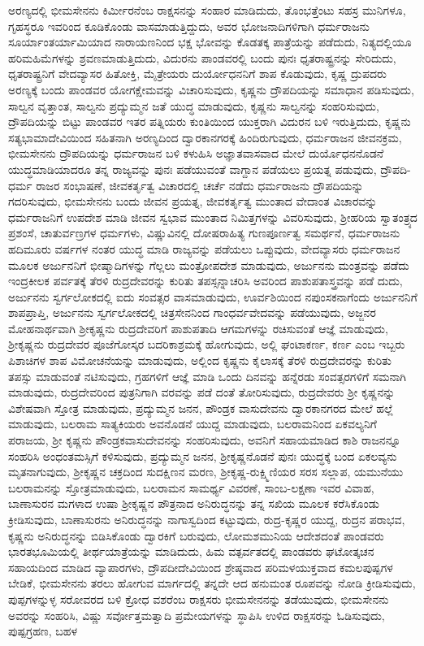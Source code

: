 ಅರಣ್ಯದಲ್ಲಿ ಭೀಮಸೇನನು ಕಿರ್ಮೀರನೆಂಬ ರಾಕ್ಷಸನನ್ನು ಸಂಹಾರ ಮಾಡಿದುದು, ತೊಂಭತ್ತೆಂಟು ಸಹಸ್ರ ಮುನಿಗಳೂ, ಗೃಹಸ್ಥರೂ ಇವರಿಂದ ಕೂಡಿಕೊಂಡು ವಾಸಮಾಡು\-ತ್ತಿದ್ದುದು, ಅವರ ಭೋಜನಾದಿಗಳಿಗಾಗಿ ಧರ್ಮರಾಜನು ಸೂರ್ಯಾಂತರ್ಯಾಮಿಯಾದ ನಾರಾಯಣನಿಂದ ಭಕ್ಷ ಭೋವನ್ನು ಕೊಡತಕ್ಕ ಪಾತ್ರೆಯನ್ನು ಪಡೆದುದು, ನಿತ್ಯದಲ್ಲಿಯೂ ಹರಿಮಹಿಮೆಗಳನ್ನು ಶ್ರವಣಮಾಡುತ್ತಿದುದು, ವಿದುರನು ಪಾಂಡವರಲ್ಲಿ ಬಂದು ಪುನಃ ಧೃತರಾಷ್ಟ್ರನನ್ನು ಸೇರಿದುದು, ಧೃತರಾಷ್ಟ್ರನಿಗೆ ವೇದವ್ಯಾಸರ ಹಿತೋಕ್ತಿ, ಮೈತ್ರೇಯರು ದುರ್ಯೋಧನನಿಗೆ ಶಾಪ ಕೊಡುವುದು, ಕೃಷ್ಣ ದ್ರುಪದರು ಅರಣ್ಯಕ್ಕೆ ಬಂದು ಪಾಂಡವರ ಯೋಗಕ್ಷೇಮವನ್ನು ವಿಚಾರಿಸುವುದು, ಕೃಷ್ಣನು ದ್ರೌಪದಿಯನ್ನು ಸಮಾಧಾನ ಪಡಿಸುವುದು, ಸಾಲ್ವನ ವೃತ್ತಾಂತ, ಸಾಲ್ವನು ಪ್ರದ್ಯುಮ್ಮನ ಜತೆ ಯುದ್ಧ ಮಾಡುವುದು, ಕೃಷ್ಣನು ಸಾಲ್ವನನ್ನು ಸಂಹರಿಸುವುದು, ದ್ರೌಪದಿಯನ್ನು ಬಿಟ್ಟು ಪಾಂಡವರ ಇತರ ಪತ್ನಿಯರು ಕುಂತಿಯಿಂದ ಯುಕ್ತರಾಗಿ ವಿದುರನ ಬಳಿ ಇರುತ್ತಿದುದು, ಕೃಷ್ಣನು ಸತ್ಯಭಾಮಾದೇವಿಯಿಂದ ಸಹಿತನಾಗಿ ಅರಣ್ಯದಿಂದ ದ್ವಾರಕಾನಗರಕ್ಕೆ ಹಿಂದಿರುಗುವುದು, ಧರ್ಮರಾಜನ ಜೀವನಕ್ರಮ, ಭೀಮಸೇನನು ದ್ರೌಪದಿಯನ್ನು ಧರ್ಮರಾಜನ ಬಳಿ ಕಳುಹಿಸಿ ಅಜ್ಞಾತವಾಸವಾದ ಮೇಲೆ ದುರ್ಯೊಧನನೊಡನೆ ಯುದ್ಧಮಾಡಿಯಾದರೂ ತನ್ನ ರಾಜ್ಯವನ್ನು ಪುನಃ ಪಡೆಯುವಂತೆ ವಾಗ್ದಾನ ಪಡೆಯಲು ಪ್ರಯತ್ನ ಪಡುವುದು, ದ್ರೌಪದಿ-ಧರ್ಮ ರಾಜರ ಸಂಭಾಷಣೆ, ಜೀವಕರ್ತೃತ್ವ ವಿಚಾರದಲ್ಲಿ ಚರ್ಚೆ ನಡೆದು ಧರ್ಮರಾಜನು ದ್ರೌಪದಿಯನ್ನು ಗದರಿಸುವುದು, ಭೀಮಸೇನನು ಬಂದು ಜೀವನ ಪ್ರಯತ್ನ, ಜೀವಕರ್ತೃತ್ವ ಮುಂತಾದ ವೇದಾಂತ ವಿಚಾರವನ್ನು ಧರ್ಮರಾಜನಿಗೆ ಉಪದೇಶ ಮಾಡಿ ಜೀವನ ಸ್ವಭಾವ ಮುಂತಾದ ನಿಮಿತ್ತಗಳನ್ನು ವಿವರಿಸುವುದು, ಶ‍್ರೀಹರಿಯ ಸ್ವಾತಂತ್ರ್ಯದ ಪ್ರಶಂಸೆ, ಚಾತುರ್ವಣ್ರಗಳ ಧರ್ಮಗಳು, ವಿಷ್ಣುವಿನಲ್ಲಿ ದೋಷರಾಹಿತ್ಯ ಗುಣಪೂರ್ಣತ್ವ ಸಮರ್ಥನೆ, ಧರ್ಮರಾಜನು ಹದಿಮೂರು ವರ್ಷಗಳ ನಂತರ ಯುದ್ಧ ಮಾಡಿ ರಾಜ್ಯವನ್ನು ಪಡೆಯಲು ಒಪ್ಪುವುದು, ವೇದವ್ಯಾಸರು ಧರ್ಮರಾಜನ ಮೂಲಕ ಅರ್ಜುನನಿಗೆ ಭೀಷ್ಮಾದಿಗಳನ್ನು ಗೆಲ್ಲಲು ಮಂತ್ರೋಪದೇಶ ಮಾಡುವುದು, ಅರ್ಜುನನು ಮಂತ್ರವನ್ನು ಪಡೆದು ಇಂದ್ರಕೀಲಕ ಪರ್ವತಕ್ಕೆ ತೆರಳಿ ರುದ್ರದೇವರನ್ನು ಕುರಿತು ತಪಸ್ಸನ್ನಾಚರಿಸಿ ಅವರಿಂದ ಪಾಶುಪತಾಸ್ತ್ರವನ್ನು ಪಡೆ ದುದು, ಅರ್ಜುನನು ಸ್ವರ್ಗಲೋಕದಲ್ಲಿ ಐದು ಸಂವತ್ಸರ ವಾಸಮಾಡುವುದು, ಊರ್ವಶಿಯಿಂದ ನಪುಂಸಕನಾಗೆಂದು ಅರ್ಜುನನಿಗೆ ಶಾಪಪ್ರಾಪ್ತಿ, ಅರ್ಜುನನು ಸ್ವರ್ಗಲೋಕದಲ್ಲಿ ಚಿತ್ರಸೇನನಿಂದ ಗಾಂಧರ್ವವೇದವನ್ನು ಪಡೆಯುವುದು, ಅಜ್ಜನರ ಮೋಹನಾರ್ಥವಾಗಿ ಶ‍್ರೀಕೃಷ್ಣನು ರುದ್ರದೇವರಿಗೆ ಪಾಶುಪತಾದಿ ಆಗಮಗಳನ್ನು ರಚಿಸುವಂತೆ ಆಜ್ಞೆ ಮಾಡುವುದು, ಶ‍್ರೀಕೃಷ್ಣನು ರುದ್ರದೇವರ ಪೂಜೆಗೋಸ್ಕರ ಬದರಿಕಾಶ್ರಮಕ್ಕೆ ಹೋಗುವುದು, ಅಲ್ಲಿ ಘಂಟಾಕರ್ಣ, ಕರ್ಣ ಎಂಬ ಇಬ್ಬರು ಪಿಶಾಚಿಗಳ ಶಾಪ ವಿಮೋಚನೆಯನ್ನು ಮಾಡುವುದು, ಅಲ್ಲಿಂದ ಕೃಷ್ಣನು ಕೈಲಾಸಕ್ಕೆ ತೆರಳಿ ರುದ್ರದೇವರನ್ನು ಕುರಿತು ತಪಸ್ಸು ಮಾಡುವಂತೆ ನಟಿಸುವುದು, ಗ್ರಹಗಳಿಗೆ ಆಜ್ಞೆ ಮಾಡಿ ಒಂದು ದಿನವನ್ನು ಹನ್ನೆರಡು ಸಂವತ್ಸರಗಳಿಗೆ ಸಮನಾಗಿ ಮಾಡುವುದು, ರುದ್ರದೇವರಿಂದ ಪುತ್ರನಿಗಾಗಿ ವರವನ್ನು ಪಡೆ ದಂತೆ ತೋರಿಸುವುದು, ರುದ್ರದೇವರು ಶ‍್ರೀ ಕೃಷ್ಣನನ್ನು ವಿಶೇಷವಾಗಿ ಸ್ತೋತ್ರ ಮಾಡುವುದು, ಪ್ರದ್ಯುಮ್ಮನ ಜನನ, ಪೌಂಡ್ರಕ ವಾಸುದೇವನು ದ್ವಾರಕಾನಗರದ ಮೇಲೆ ಹಲ್ಲೆ ಮಾಡುವುದು, ಬಲರಾಮ ಸಾತ್ಯಕಿಯರು ಅವನೊಡನೆ ಯುದ್ದ ಮಾಡುವುದು, ಬಲರಾಮನಿಂದ ಏಕವಲ್ಯನಿಗೆ ಪರಾಜಯ, ಶ‍್ರೀ ಕೃಷ್ಣನು ಪೌಂಡ್ರಕವಾಸುದೇವನನ್ನು ಸಂಹರಿಸುವುದು, ಅವನಿಗೆ ಸಹಾಯಮಾಡಿದ ಕಾಶಿ ರಾಜನನ್ನೂ ಸಂಹರಿಸಿ ಅಂಧಂತಮಸ್ಸಿಗೆ ಕಳಿಸುವುದು, ಪ್ರದ್ಯುಮ್ಮನ ಜನನ, ಶ‍್ರೀಕೃಷ್ಣನೊಡನೆ ಪುನಃ ಯುದ್ಧಕ್ಕೆ ಬಂದ ಏಕಲವ್ಯನು ಮೃತನಾಗುವುದು, ಶ‍್ರೀಕೃಷ್ಣನ ಚಕ್ರದಿಂದ ಸುದಕ್ಷಿಣನ ಮರಣ, ಶ‍್ರೀಕೃಷ್ಣ-ರುಕ್ಷ್ಮಿಣಿಯರ ಸರಸ ಸಲ್ಲಾಪ, ಯಮುನೆಯು ಬಲರಾಮನನ್ನು ಸ್ತೋತ್ರಮಾಡುವುದು, ಬಲರಾಮನ ಸಾಮರ್ಥ್ಯ ವಿವರಣೆ, ಸಾಂಬ-ಲಕ್ಷಣಾ ಇವರ ವಿವಾಹ, ಬಾಣಾಸುರನ ಮಗಳಾದ ಉಷಾ ಶ‍್ರೀಕೃಷ್ಣನ ಪೌತ್ರನಾದ ಅನಿರುದ್ಧನನ್ನು ತನ್ನ ಸಖಿಯ ಮೂಲಕ ಕರೆಸಿಕೊಂಡು ಕ್ರೀಡಿಸುವುದು, ಬಾಣಾಸುರನು ಅನಿರುದ್ಧನನ್ನು ನಾಗಾಸ್ವದಿಂದ ಕಟ್ಟುವುದು, ರುದ್ರ-ಕೃಷ್ಣರ ಯುದ್ದ, ರುದ್ರನ ಪರಾಭವ, ಕೃಷ್ಣನು ಅನಿರುದ್ಧನನ್ನು ಬಿಡಿಸಿಕೊಂಡು ದ್ವಾರಕಿಗೆ ಬರುವುದು, ಲೋಮಶಮುನಿಯ ಆದೇಶದಂತೆ ಪಾಂಡವರು ಭಾರತಭೂಮಿಯಲ್ಲಿ ತೀರ್ಥಯಾತ್ರೆಯನ್ನು ಮಾಡಿದುದು, ಹಿಮ ವತ್ಪರ್ವತದಲ್ಲಿ ಪಾಂಡವರು ಘಟೋತ್ಕಚನ ಸಹಾಯದಿಂದ ಮಾಡಿದ ವ್ಯಾಪಾರಗಳು, ದ್ರೌಪದೀದೇವಿಯಿಂದ ಶ್ರೇಷ್ಠವಾದ ಪರಿಮಳಯುಕ್ತವಾದ ಕಮಲಪುಷ್ಪಗಳ ಬೇಡಿಕೆ, ಭೀಮಸೇನನು ತರಲು ಹೋಗುವ ಮಾರ್ಗದಲ್ಲಿ ತನ್ನದೇ ಆದ ಹನುಮಂತ ರೂಪವನ್ನು ನೋಡಿ ಕ್ರೀಡಿಸುವುದು, ಪುಪ್ಪಗಳನ್ನುಳ್ಳ ಸರೋವರದ ಬಳಿ ಕ್ರೋಧ ವಶರೆಂಬ ರಾಕ್ಷಸರು ಭೀಮಸೇನನನ್ನು ತಡೆಯುವುದು, ಭೀಮಸೇನನು ಅವರನ್ನು ಸಂಹರಿಸಿ, ವಿಷ್ಣು ಸರ್ವೋತ್ತಮತ್ವಾದಿ ಪ್ರಮೇಯಗಳನ್ನು ಸ್ಥಾಪಿಸಿ ಉಳಿದ ರಾಕ್ಷಸರನ್ನು ಓಡಿಸುವುದು, ಪುಷ್ಪಗ್ರಹಣ, ಬಹಳ 
